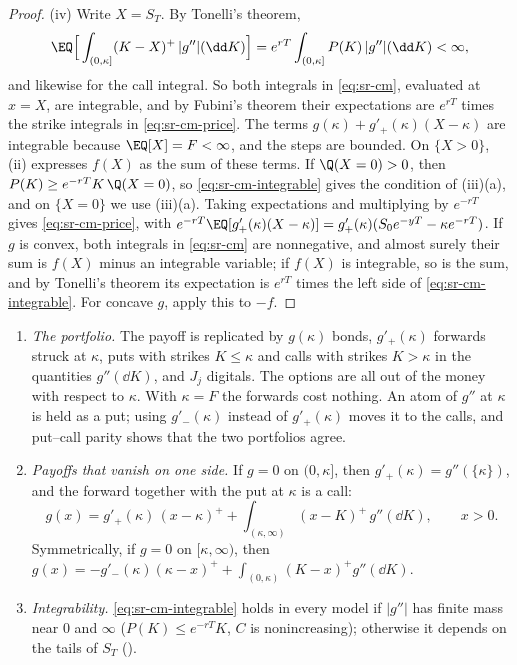 \begin{proof}
(iv) Write $X=S_T$. By Tonelli's theorem,
\[
  \EQ\Big[\int_{(0,\kappa]}(K-X)^+\,|g''|(\dd K)\Big]=e^{rT}\int_{(0,\kappa]}P(K)\,|g''|(\dd K)<\infty,
\]
and likewise for the call integral. So both integrals in \eqref{eq:sr-cm}, evaluated at $x=X$, are integrable, and by Fubini's
theorem their expectations are $e^{rT}$ times the strike integrals in \eqref{eq:sr-cm-price}. The terms
$g(\kappa)+g'_+(\kappa)(X-\kappa)$ are integrable because $\EQ[X]=F<\infty$, and the steps are bounded. On
$\{X>0\}$, (ii) expresses $f(X)$ as the sum of these terms. If $\Q(X=0)>0$, then
$P(K)\ge e^{-rT}K\,\Q(X=0)$, so \eqref{eq:sr-cm-integrable} gives the condition of (iii)(a), and on $\{X=0\}$ we
use (iii)(a). Taking
expectations and multiplying by $e^{-rT}$ gives \eqref{eq:sr-cm-price}, with
$e^{-rT}\EQ[g'_+(\kappa)(X-\kappa)]=g'_+(\kappa)(S_0e^{-yT}-\kappa e^{-rT})$. If $g$ is convex, both integrals in
\eqref{eq:sr-cm} are nonnegative, and almost surely their sum is $f(X)$ minus an integrable variable; if $f(X)$ is
integrable, so is the sum, and by Tonelli's theorem its expectation is $e^{rT}$ times the left side of
\eqref{eq:sr-cm-integrable}. For concave $g$, apply this to $-f$.
\end{proof}

\begin{remark}\label{rem:sr-cm-reading}
\leavevmode
\begin{enumerate}[label=(\alph*),leftmargin=*]
  \item \emph{The portfolio.} The payoff is replicated by $g(\kappa)$ bonds, $g'_+(\kappa)$ forwards struck at
    $\kappa$, puts with strikes $K\le\kappa$ and calls with strikes $K>\kappa$ in the quantities
    $g''(\dd K)$, and $J_j$ digitals. The options are all out of the money with respect to $\kappa$. With
    $\kappa=F$ the forwards cost nothing. An atom of $g''$ at $\kappa$ is held as a put; using $g'_-(\kappa)$
    instead of $g'_+(\kappa)$ moves it to the calls, and put--call parity shows that the two portfolios
    agree.
  \item \emph{Payoffs that vanish on one side.} If $g=0$ on $(0,\kappa]$, then $g'_+(\kappa)=g''(\{\kappa\})$,
    and the forward together with the put at $\kappa$ is a call:
    \begin{equation}\label{eq:sr-cm-calls}
      g(x)=g'_+(\kappa)\,(x-\kappa)^++\int_{(\kappa,\infty)}(x-K)^+\,g''(\dd K),\qquad x>0 .
    \end{equation}
    Symmetrically, if $g=0$ on $[\kappa,\infty)$, then $g(x)=-g'_-(\kappa)(\kappa-x)^++\int_{(0,\kappa)}(K-x)^+g''(\dd K)$.
  \item \emph{Integrability.} \eqref{eq:sr-cm-integrable} holds in every model if $|g''|$ has finite mass near
    $0$ and $\infty$ ($P(K)\le e^{-rT}K$, $C$ is nonincreasing); otherwise it depends on the tails of $S_T$
    ().
\end{enumerate}
\end{remark}

